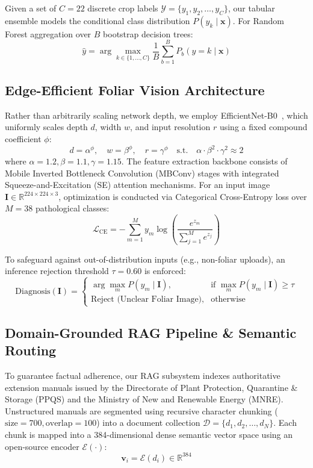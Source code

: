 \documentclass[conference]{IEEEtran}
\begin{document}
Given a set of $C = 22$ discrete crop labels $\mathcal{Y} = \{y_1, y_2, \dots, y_C\}$, our tabular ensemble models the conditional class distribution $P(y_k \mid \mathbf{x})$. For Random Forest aggregation over $B$ bootstrap decision trees:
\begin{equation}
\hat{y} = \arg\max_{k \in \{1,\dots,C\}} \frac{1}{B} \sum_{b=1}^{B} P_b(y = k \mid \mathbf{x})
\end{equation}

\subsection{Edge-Efficient Foliar Vision Architecture}
Rather than arbitrarily scaling network depth, we employ EfficientNet-B0~\cite{tan2019efficientnet}, which uniformly scales depth $d$, width $w$, and input resolution $r$ using a fixed compound coefficient $\phi$:
\begin{equation}
d = \alpha^\phi, \quad w = \beta^\phi, \quad r = \gamma^\phi \quad \text{s.t.} \quad \alpha \cdot \beta^2 \cdot \gamma^2 \approx 2
\end{equation}
where $\alpha=1.2, \beta=1.1, \gamma=1.15$. The feature extraction backbone consists of Mobile Inverted Bottleneck Convolution (MBConv) stages with integrated Squeeze-and-Excitation (SE) attention mechanisms. For an input image $\mathbf{I} \in \mathbb{R}^{224 \times 224 \times 3}$, optimization is conducted via Categorical Cross-Entropy loss over $M=38$ pathological classes:
\begin{equation}
\mathcal{L}_{\text{CE}} = -\sum_{m=1}^{M} y_m \log\left(\frac{e^{z_m}}{\sum_{j=1}^{M} e^{z_j}}\right)
\end{equation}

To safeguard against out-of-distribution inputs (e.g., non-foliar uploads), an inference rejection threshold $\tau = 0.60$ is enforced:
\begin{equation}
\text{Diagnosis}(\mathbf{I}) = 
\begin{cases} 
\arg\max_m P(y_m \mid \mathbf{I}), & \text{if } \max_m P(y_m \mid \mathbf{I}) \ge \tau \\
\text{Reject (Unclear Foliar Image)}, & \text{otherwise}
\end{cases}
\end{equation}

\subsection{Domain-Grounded RAG Pipeline & Semantic Routing}
To guarantee factual adherence, our RAG subsystem indexes authoritative extension manuals issued by the Directorate of Plant Protection, Quarantine \& Storage (PPQS) and the Ministry of New and Renewable Energy (MNRE). Unstructured manuals are segmented using recursive character chunking ($\text{size} = 700, \text{overlap} = 100$) into a document collection $\mathcal{D} = \{d_1, d_2, \dots, d_N\}$. Each chunk is mapped into a 384-dimensional dense semantic vector space using an open-source encoder $\mathcal{E}(\cdot)$:
\begin{equation}
\mathbf{v}_i = \mathcal{E}(d_i) \in \mathbb{R}^{384}
\end{equation}
\end{document}
